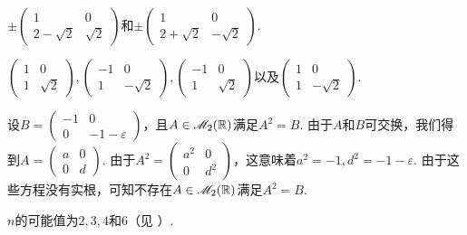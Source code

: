 \begin{solution}
  \begin{inparaenum}[(a)]
    \item $\pm\begin{pmatrix}
      1 & 0 \\
      2-\sqrt2 & \sqrt2
    \end{pmatrix}$和$\pm\begin{pmatrix}
      1 & 0 \\
      2+\sqrt2 & -\sqrt2
    \end{pmatrix}$.

    \item $\begin{pmatrix}
      1 & 0 \\
      1 & \sqrt2
    \end{pmatrix},\begin{pmatrix}
      -1 & 0 \\
      1 & -\sqrt2
    \end{pmatrix},\begin{pmatrix}
      -1 & 0 \\
      1 & \sqrt2
    \end{pmatrix}$以及$\begin{pmatrix}
      1 & 0 \\
      1 & - \sqrt2
    \end{pmatrix}$.
  \end{inparaenum}
\end{solution}

\begin{solution}
  设$B=\begin{pmatrix}
    -1 & 0 \\
    0 & -1-\varepsilon
  \end{pmatrix}$，且$A\in\mathscr M_2(\mathbb R)$满足$A^2=B$. 由于$A$和$B$可交换，我们得到$A=\begin{pmatrix}
    a & 0 \\
    0 & d
  \end{pmatrix}$. 由于$A^2=\begin{pmatrix}
    a^2 & 0 \\
    0 & d^2
  \end{pmatrix}$，这意味着$a^2=-1,d^2=-1-\varepsilon$. 由于这些方程没有实根，可知不存在$A\in\mathscr M_2(\mathbb R)$满足$A^2=B$.
\end{solution}

\begin{solution}
  $n$的可能值为$2,3,4$和$6$（见 \cite[528--529]{58}）.
\end{solution}

